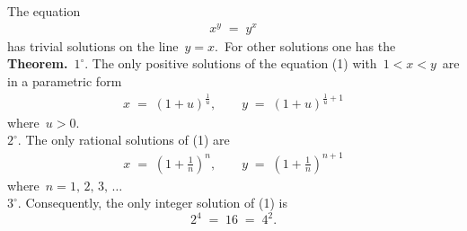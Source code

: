 \documentclass[12pt]{article}
\theoremstyle{definition}
\begin{document}
The equation
\begin{align}
x^y \;=\; y^x
\end{align}
has trivial solutions on the line \,$y = x$.\, For other solutions one has the\\

\textbf{Theorem.}\, $1^\circ$. The only positive solutions of the equation (1) with\,  $1 < x < y$\, are in a parametric form
\begin{align}
x \;=\; (1\!+\!u)^{\frac{1}{u}}, \qquad y \;=\; (1\!+\!u)^{\frac{1}{u}+1}
\end{align}
where\, $u > 0$.\\
$2^\circ$. The only rational solutions of (1) are
\begin{align}
x \;=\; \left(1\!+\!\frac{1}{n}\right)^n\!, \qquad y \;=\; \left(1\!+\!\frac{1}{n}\right)^{n+1}
\end{align}
where\, $n = 1,\,2,\,3,\,\ldots$\\
$3^\circ$. Consequently, the only integer solution of (1) is
$$2^4 \;=\; 16 \;=\; 4^2.$$\\
\end{document}

